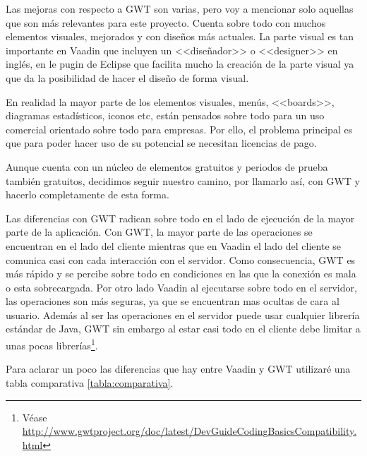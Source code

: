 Las mejoras con respecto a GWT son varias, pero voy a mencionar solo aquellas que son más relevantes para este proyecto. Cuenta sobre todo con muchos elementos visuales, mejorados y con diseños más actuales. La parte visual es tan importante en Vaadin que incluyen un <<diseñador>> o <<designer>> en inglés, en le pugin de Eclipse que facilita mucho la creación de la parte visual ya que da la posibilidad de hacer el diseño de forma visual.

En realidad la mayor parte de los elementos visuales, menús, <<boards>>, diagramas estadísticos, iconos etc, están pensados sobre todo para un uso comercial orientado sobre todo para empresas. Por ello, el problema principal es que para poder hacer uso de su potencial se necesitan licencias de pago.

Aunque cuenta con un núcleo de elementos gratuitos y periodos de prueba también gratuitos, decidimos seguir nuestro camino, por llamarlo así, con GWT y hacerlo completamente de esta forma.

Las diferencias con GWT radican sobre todo en el lado de ejecución de la mayor parte de la aplicación. Con GWT, la mayor parte de las operaciones se encuentran en el lado del cliente mientras que en Vaadin el lado del cliente se comunica casi con cada interacción con el servidor. Como consecuencia, GWT es más rápido y se percibe sobre todo en condiciones en las que la conexión es mala o esta sobrecargada. Por otro lado Vaadin al ejecutarse sobre todo en el servidor, las operaciones son más seguras, ya que se encuentran mas ocultas de cara al usuario. Además al ser las operaciones en el servidor puede usar cualquier librería estándar de Java, GWT sin embargo al estar casi todo en el cliente debe limitar a unas pocas librerías\footnote{Véase \url{http://www.gwtproject.org/doc/latest/DevGuideCodingBasicsCompatibility.html}}.

Para aclarar un poco las diferencias que hay entre Vaadin y GWT utilizaré una tabla comparativa \ref{tabla:comparativa}.



